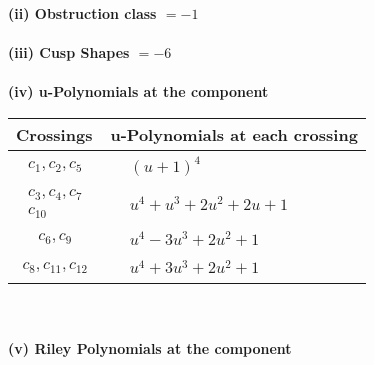 \documentclass[1p]{elsarticle_modified}
\theoremstyle{definition}
\begin{document}
\flushleft \textbf{(ii) Obstruction class $= -1$}\\~\\
\flushleft \textbf{(iii) Cusp Shapes $= -6$}\\~\\
\newpage\renewcommand{\arraystretch}{1}
\flushleft \textbf{(iv) u-Polynomials at the component}\newline \\
\begin{tabular}{m{50pt}|m{274pt}}
Crossings & \hspace{64pt}u-Polynomials at each crossing \\
\hline $$\begin{aligned}c_{1},c_{2},c_{5}\end{aligned}$$&$\begin{aligned}
&(u+1)^4
\end{aligned}$\\
\hline $$\begin{aligned}c_{3},c_{4},c_{7}\\c_{10}\end{aligned}$$&$\begin{aligned}
&u^4+u^3+2 u^2+2 u+1
\end{aligned}$\\
\hline $$\begin{aligned}c_{6},c_{9}\end{aligned}$$&$\begin{aligned}
&u^4-3 u^3+2 u^2+1
\end{aligned}$\\
\hline $$\begin{aligned}c_{8},c_{11},c_{12}\end{aligned}$$&$\begin{aligned}
&u^4+3 u^3+2 u^2+1
\end{aligned}$\\
\hline
\end{tabular}\\~\\
\newpage\renewcommand{\arraystretch}{1}
\flushleft \textbf{(v) Riley Polynomials at the component}\newline \\
\end{document}
